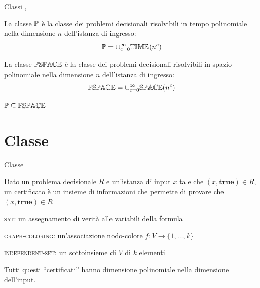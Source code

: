 \begin{frame}{Classi \PTIME, \PSPACE}

\vspace{-9pt}
\begin{myboxtitle}
La \alert{classe $\mbox{\sc $\mathbb{P}$}$} è la classe dei problemi decisionali risolvibili
in tempo polinomiale nella dimensione $n$ dell'istanza di ingresso:
\[
  \mbox{\sc $\mathbb{P}$} = \cup_{c=0}^{\infty} \mbox{$\mathbb{TIME}$}(n^c)
\]
\end{myboxtitle}

\begin{myboxtitle}
La \alert{classe $\mbox{$\mathbb{PSPACE}$}$} è la classe dei problemi decisionali risolvibili
in spazio polinomiale nella dimensione $n$ dell'istanza di ingresso:
\[
  \mbox{$\mathbb{PSPACE}$} = \cup_{c=0}^{\infty} \mbox{$\mathbb{SPACE}$}(n^c)
\]
\end{myboxtitle}

\begin{myboxtitle}[Note]
$\mbox{\sc $\mathbb{P}$} \subseteq \mbox{$\mathbb{PSPACE}$}$
\end{myboxtitle}

\end{frame}

\section{Classe \NP}
\begin{frame}{Classe \NP}

\vspace{-9pt}
\begin{myboxtitle}[Certificato]
Dato un problema decisionale $R$ e un'istanza di input $x$ tale
che $(x, \mathbf{true}) \in R$, un \alert{certificato} è un insieme di informazioni che permette di provare che $(x, \mathbf{true}) \in R$
\end{myboxtitle}

\begin{myboxtitle}[Esempi]
\BIL
\item \textsc{sat}: un assegnamento di verità alle variabili 
  della formula
\item \textsc{graph-coloring}: un'associazione nodo-colore $f: V \rightarrow \{ 1, \ldots, k \}$  
\item \textsc{independent-set}: un sottoinsieme di $V$ di $k$ elementi
\EIL

Tutti questi ``certificati'' hanno dimensione polinomiale nella dimensione dell'input.
\end{myboxtitle}

\end{frame}

